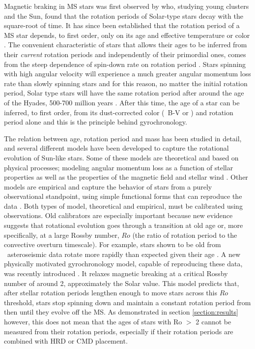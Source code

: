 Magnetic braking in MS stars was first observed by \citet{skumanich1972} who,
studying young clusters and the Sun, found that the rotation periods of
Solar-type stars decay with the square-root of time.
It has since been established that the rotation period of a MS star depends,
to first order, only on its age and effective temperature or color
\citep[\eg][]{barnes2003}.
The convenient characteristic of stars that allows their ages to be inferred
from their {\it current} rotation periods and independently of their
primordial ones, comes from the steep dependence of spin-down rate on rotation
period \citep{kawaler1989}.
Stars spinning with high angular velocity will experience a much greater
angular momentum loss rate than slowly spinning stars and for this reason, no
matter the initial rotation period, Solar type stars will have the same
rotation period after around the age of the Hyades, 500-700 million years
\citep{irwin2009, gallet2015}.
After this time, the age of a star can be inferred, to first order, from its
dust-corrected color (\eg\ B-V or \gcolor) and rotation period alone and this
is the principle behind gyrochronology.

The relation between age, rotation period and mass has been studied in detail,
and several different models have been developed to capture the rotational
evolution of Sun-like stars.
Some of these models are theoretical and based on physical processes; modeling
angular momentum loss as a function of stellar properties as well as the
properties of the magnetic field and stellar wind \citep[\eg][]{kawaler1988,
kawaler1989, vansaders2013, matt2015, vansaders2016}.
Other models are empirical and capture the behavior of stars from a purely
observational standpoint, using simple functional forms that can reproduce the
data \citep[\eg][]{barnes2003, barnes2007, mamajek2008, angus2015}.
Both types of model, theoretical and empirical, must be calibrated using
observations.
Old calibrators are especially important because new evidence suggests that
rotational evolution goes through a transition at old age or, more
specifically, at a large Rossby number, $Ro$ (the ratio of rotation period to
the convective overturn timescale).
For example, stars shown to be old from \kepler\ asteroseismic data rotate
more rapidly than expected given their age \citep{angus2015, vansaders2016}.
A new physically motivated gyrochronology model, capable of reproducing these
data, was recently introduced \citep{vansaders2016}.
It relaxes magnetic breaking at a critical Rossby number of around 2,
approximately the Solar value.
This model predicts that, after stellar rotation periods lengthen enough to
move stars across this $Ro$ threshold, stars stop spinning down and maintain a
constant rotation period from then until they evolve off the MS.
As demonstrated in section \ref{section:results} however, this does not mean
that the ages of stars with Ro $>$ 2 cannot be measured from their rotation
periods, especially if their rotation periods are combined with HRD or CMD
placement.

